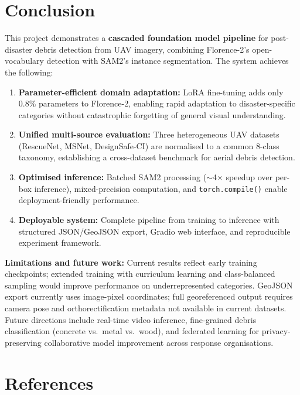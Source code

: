 \documentclass[10pt,a4paper,twocolumn]{article}
\begin{document}
\section{Conclusion}

This project demonstrates a \textbf{cascaded foundation model pipeline} for post-disaster debris detection from UAV imagery, combining Florence-2's open-vocabulary detection with SAM2's instance segmentation. The system achieves the following:

\begin{enumerate}
  \item \textbf{Parameter-efficient domain adaptation:} LoRA fine-tuning adds only 0.8\% parameters to Florence-2, enabling rapid adaptation to disaster-specific categories without catastrophic forgetting of general visual understanding.
  \item \textbf{Unified multi-source evaluation:} Three heterogeneous UAV datasets (RescueNet, MSNet, DesignSafe-CI) are normalised to a common 8-class taxonomy, establishing a cross-dataset benchmark for aerial debris detection.
  \item \textbf{Optimised inference:} Batched SAM2 processing ($\sim$4$\times$ speedup over per-box inference), mixed-precision computation, and \texttt{torch.compile()} enable deployment-friendly performance.
  \item \textbf{Deployable system:} Complete pipeline from training to inference with structured JSON/GeoJSON export, Gradio web interface, and reproducible experiment framework.
\end{enumerate}

\textbf{Limitations and future work:} Current results reflect early training checkpoints; extended training with curriculum learning and class-balanced sampling would improve performance on underrepresented categories. GeoJSON export currently uses image-pixel coordinates; full georeferenced output requires camera pose and orthorectification metadata not available in current datasets. Future directions include real-time video inference, fine-grained debris classification (concrete vs.\ metal vs.\ wood), and federated learning for privacy-preserving collaborative model improvement across response organisations.


\section{References}
\end{document}
